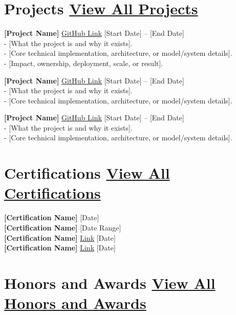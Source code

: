 \documentclass[10pt,letterpaper]{article}
\begin{document}
\section*{Projects \hfill \footnotesize \href{https://www.linkedin.com/in/[linkedin-id]/details/projects/}{View All Projects}}

\textbf{[Project Name]} \href{https://github.com/[github-id]/[project-repo]}{GitHub Link} \hfill [Start Date] -- [End Date] \\
- [What the project is and why it exists]. \\
- [Core technical implementation, architecture, or model/system details]. \\
- [Impact, ownership, deployment, scale, or result].

\textbf{[Project Name]} \href{https://github.com/[github-id]/[project-repo]}{GitHub Link} \hfill [Start Date] -- [End Date] \\
- [What the project is and why it exists]. \\
- [Core technical implementation, architecture, or model/system details].

\textbf{[Project Name]} \href{https://github.com/[github-id]/[project-repo]}{GitHub Link} \hfill [Start Date] -- [End Date] \\
- [What the project is and why it exists]. \\
- [Core technical implementation, architecture, or model/system details].

\section*{Certifications \hfill \footnotesize \href{https://www.linkedin.com/in/[linkedin-id]/details/certifications/}{View All Certifications}}

\textbf{[Certification Name]} \hfill [Date] \\
\textbf{[Certification Name]} \hfill [Date Range] \\
\textbf{[Certification Name]} \href{[credential-link]}{Link} \hfill [Date] \\
\textbf{[Certification Name]} \href{[credential-link]}{Link} \hfill [Date]

\section*{Honors and Awards \hfill \footnotesize \href{https://www.linkedin.com/in/[linkedin-id]/details/honors/}{View All Honors and Awards}}
\end{document}

